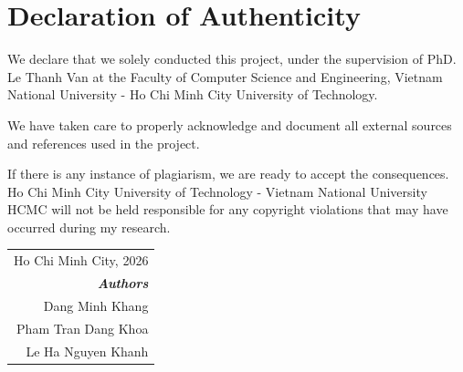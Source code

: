 \chapter*{Declaration of Authenticity}

We declare that we solely conducted this project, under the supervision of PhD. Le Thanh Van at the Faculty of Computer Science and Engineering, Vietnam National University - Ho Chi Minh City University of Technology.

We have taken care to properly acknowledge and document all external sources and references used in the project.

If there is any instance of plagiarism, we are ready to accept the consequences. Ho Chi Minh City University of Technology - Vietnam National University HCMC will not be held responsible for any copyright violations that may have occurred during my research.

\vspace{2cm}

\begin{flushright}
\begin{tabular}{r}
    Ho Chi Minh City, 2026 \\
    \textit{\textbf{Authors}} \\
    Dang Minh Khang \\
    Pham Tran Dang Khoa \\
    Le Ha Nguyen Khanh
\end{tabular}
\end{flushright}

